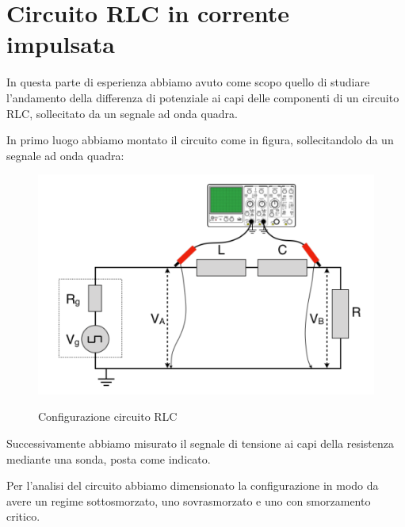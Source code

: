 \section{Circuito RLC in corrente impulsata}
In questa parte di esperienza abbiamo avuto come scopo quello di studiare l'andamento della differenza di potenziale ai capi delle componenti di un circuito RLC, sollecitato da un segnale ad onda quadra.

In primo luogo abbiamo montato il circuito come in figura, sollecitandolo da un segnale ad onda quadra:
\begin{figure} [H]
    \centering
    \includegraphics[scale=.9]{Immagini/Configurazione2.PNG}
    \label{fig:my_label}
    \caption{Configurazione circuito RLC}
\end{figure}

Successivamente abbiamo misurato il segnale di tensione ai capi della resistenza mediante una sonda, posta come indicato.


Per l'analisi del circuito abbiamo dimensionato la configurazione in modo da avere un regime sottosmorzato, uno sovrasmorzato e uno con smorzamento critico.


